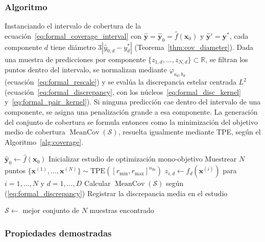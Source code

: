 \documentclass[12pt]{report} %
\begin{document}
\subsubsection{Algoritmo}

Instanciando el intervalo de cobertura de la ecuación~\eqref{eq:formal_coverage_interval} con $\hat{\mathbf{y}} = \hat{\mathbf{y}}_0 = \hat{f}(\mathbf{x}_0)$ y $\hat{\mathbf{y}}' = \mathbf{y}^{*}$, cada componente $d$ tiene diámetro $3|\hat{y}_{0,d} - y^{*}_d|$ (Teorema~\ref{thm:cov_diameter}). Dada una muestra de predicciones por componente $\{z_{1,d}, \ldots, z_{N,d}\} \subset \mathbb{R}$, se filtran los puntos dentro del intervalo, se normalizan mediante $\varphi_{a_d,b_d}$ (ecuación~\eqref{eq:formal_rescale}) y se evalúa la discrepancia estelar centrada $L^2$ (ecuación~\eqref{eq:formal_discrepancy}, con los núcleos~\eqref{eq:formal_disc_kernel} y~\eqref{eq:formal_pair_kernel}). Si ninguna predicción cae dentro del intervalo de una componente, se asigna una penalización grande a esa componente. La generación del conjunto de cobertura se formula entonces como la minimización del objetivo medio de cobertura $\operatorname{MeanCov}(\mathcal{S})$, resuelta igualmente mediante TPE, según el Algoritmo~\ref{alg:coverage}.

\begin{algorithm}[H]
    \caption{Generación del conjunto de cobertura}
    \label{alg:coverage}
    $\hat{\mathbf{y}}_0 \leftarrow \hat{f}(\mathbf{x}_0)$\;
    Inicializar estudio de optimización mono-objetivo\;
    Muestrear $N$ puntos $\{\mathbf{x}^{(1)}, \ldots, \mathbf{x}^{(N)}\} \sim \text{TPE}([r_{\min}, r_{\max}]^{n_{\text{In}}})$\;
    $z_{i,d} \leftarrow f_d(\mathbf{x}^{(i)})$ para $i = 1, \ldots, N$ y $d = 1, \ldots, D$\;
    Calcular $\operatorname{MeanCov}(\mathcal{S})$ según (\ref{eq:formal_discrepancy})\;
    Registrar la discrepancia media en el estudio\;

    $\mathcal{S} \leftarrow$ mejor conjunto de $N$ muestras encontrado\;
\end{algorithm}

\subsubsection{Propiedades demostradas}
\end{document}
